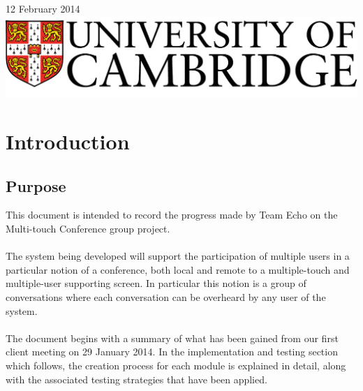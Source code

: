 \documentclass[12p, a4paper, onecolumn]{report}
\begin{document}
\begin{titlepage}

{\large 12 February 2014}\\[3cm] %


\includegraphics{logo.png}\\[1cm] %
 

\vfill %

\end{titlepage}

\setcounter{page}{1}

\tableofcontents

\newpage

\setcounter{page}{1}

\chapter{Introduction}

\section{Purpose}

This document is intended to record the progress made by Team Echo on the Multi-touch Conference group project. \\ \\
The system being developed will support the participation of multiple users in a particular notion of a conference, both local and remote to a multiple-touch and multiple-user supporting screen. In particular this notion is a group of conversations where each conversation can be overheard by any user of the system. \\ \\
The document begins with a summary of what has been gained from our first client meeting on 29 January 2014. In the implementation and testing section which follows, the creation process for each module is explained in detail, along with the associated testing strategies that have been applied.
\end{document}
